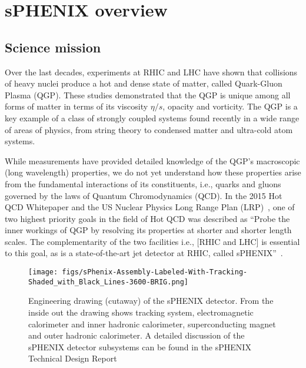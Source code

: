 \chapter{sPHENIX overview}
\label{chap:introduction}
\section{Science mission}
Over the last decades, experiments at RHIC and LHC have shown that collisions of heavy nuclei produce a hot and dense state of matter, called Quark-Gluon Plasma (QGP). These studies demonstrated that the QGP is unique among all forms of matter in terms of its viscosity $\eta/s$, opacity and vorticity. The QGP is a key example of a class of strongly coupled systems found recently in a wide range of areas of physics, from string theory to condensed matter and ultra-cold atom systems.

While measurements have provided detailed knowledge of the QGP's macroscopic (long wavelength) properties, we do not yet understand how these properties arise from the fundamental interactions of its constituents, i.e., quarks and gluons governed by the laws of Quantum Chromodynamics (QCD).  In the 2015 Hot QCD Whitepaper \cite{Akiba:2015jwa} and the US Nuclear Physics Long Range Plan (LRP)~\cite{Geesaman:2015fha}, one of two highest  priority goals in the field of Hot QCD was described as ``Probe the inner workings of QGP by resolving its properties at shorter and shorter length scales. The complementarity of the two facilities i.e., [RHIC and LHC] is essential to this goal, as is a state-of-the-art jet detector at RHIC, called sPHENIX''~\cite{Geesaman:2015fha}.

\begin{figure}[htpb]
\begin{center}
\texttt{[image: figs/sPhenix-Assembly-Labeled-With-Tracking-Shaded\_with\_Black\_Lines-3600-BRIG.png]}
\end{center}
\vspace{-0.5cm}
\caption{\label{fig:sPHENIX} Engineering drawing (cutaway) of the
  sPHENIX detector. From the inside out the drawing shows tracking
  system, electromagnetic calorimeter and inner hadronic calorimeter,
  superconducting magnet and outer hadronic calorimeter.  A
  detailed discussion of the sPHENIX detector subsystems can be found
  in the sPHENIX Technical Design Report~\cite{sPHENIX:2019tdr}}
\end{figure}

